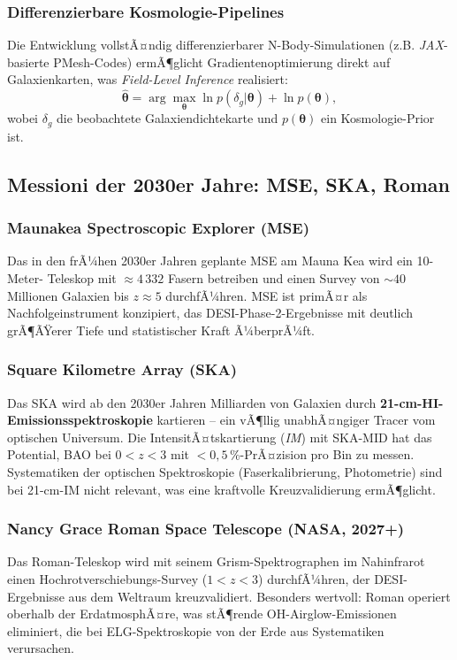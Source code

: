 ﻿\documentclass[a4paper,12pt]{article}
\theoremstyle{definition}
\theoremstyle{remark}
\begin{document}
\subsubsection*{Differenzierbare Kosmologie-Pipelines}
Die Entwicklung vollstÃ¤ndig differenzierbarer N-Body-Simulationen (z.B.
\textit{JAX}-basierte PMesh-Codes) ermÃ¶glicht Gradientenoptimierung direkt
auf Galaxienkarten, was \textit{Field-Level Inference} realisiert:
\begin{equation}
  \hat{\boldsymbol\theta} = \arg\max_{\boldsymbol\theta}
  \ln p(\delta_g|\boldsymbol\theta) + \ln p(\boldsymbol\theta),
\end{equation}
wobei $\delta_g$ die beobachtete Galaxiendichtekarte und $p(\boldsymbol\theta)$
ein Kosmologie-Prior ist.

\subsection{Messioni der 2030er Jahre: MSE, SKA, Roman}

\subsubsection*{Maunakea Spectroscopic Explorer (MSE)}
Das in den frÃ¼hen 2030er Jahren geplante MSE am Mauna Kea wird ein 10-Meter-
Teleskop mit $\approx 4\,332$ Fasern betreiben und einen Survey von
$\sim 40$ Millionen Galaxien bis $z \approx 5$ durchfÃ¼hren. MSE ist primÃ¤r
als Nachfolgeinstrument konzipiert, das DESI-Phase-2-Ergebnisse mit deutlich
grÃ¶ÃŸerer Tiefe und statistischer Kraft Ã¼berprÃ¼ft.

\subsubsection*{Square Kilometre Array (SKA)}
Das SKA wird ab den 2030er Jahren Milliarden von Galaxien durch
\textbf{21-cm-HI-Emissions\-spektroskopie} kartieren -- ein vÃ¶llig
unabhÃ¤ngiger Tracer vom optischen Universum. Die IntensitÃ¤tskartierung
(\textit{IM}) mit SKA-MID hat das Potential, BAO bei $0 < z < 3$ mit
$<0{,}5\,\%$-PrÃ¤zision pro Bin zu messen. Systematiken der optischen
Spektroskopie (Faserkalibrierung, Photometrie) sind bei 21-cm-IM nicht
relevant, was eine kraftvolle Kreuzvalidierung ermÃ¶glicht.

\subsubsection*{Nancy Grace Roman Space Telescope (NASA, 2027+)}
Das Roman-Teleskop wird mit seinem Grism-Spektrographen im Nahinfrarot einen
Hochrot\-verschiebungs-Survey ($1 < z < 3$) durchfÃ¼hren, der DESI-Ergebnisse
aus dem Weltraum kreuzvalidiert. Besonders wertvoll: Roman operiert oberhalb
der ErdatmosphÃ¤re, was stÃ¶rende OH-Airglow-Emissionen eliminiert, die bei
ELG-Spektroskopie von der Erde aus Systematiken verursachen.
\end{document}
